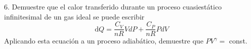 6. Demuestre que el calor transferido durante un proceso cuasiestático infinitesimal de un gas ideal se puede escribir
$$
\mathrm{d} Q=\frac{C_V}{n R} V d P+\frac{C_P}{n R} P d V
$$
Aplicando esta ecuación a un proceso adiabático, demuestre que $P V^{\gamma}=$ const.